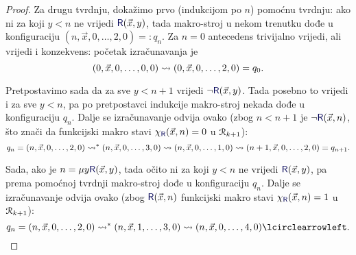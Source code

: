 \begin{proof}
	Za drugu tvrdnju, dokažimo prvo (indukcijom po $n$) pomoćnu tvrdnju: ako ni za koji $y<n$ ne vrijedi $\f R(\vec x,y)$, tada makro-stroj u nekom trenutku dođe u konfiguraciju $(n,\vec x,0,\dots,2,0)=:q_n$. Za $n=0$ antecedens trivijalno vrijedi, ali vrijedi i konzekvens: početak izračunavanja je
	\begin{equation}
		(0,\vec x,0,\dots,0,0)\leadsto(0,\vec x,0,\dots,2,0)=q_0\text.
	\end{equation}

	Pretpostavimo sada da za sve $y<n+1$ vrijedi $\lnot\f R(\vec x,y)$. Tada posebno to vrijedi i za sve $y<n$, pa po pretpostavci indukcije makro-stroj nekada dođe u konfiguraciju $q_n$. Dalje se izračunavanje odvija ovako (zbog $n<n+1$ je $\lnot\f R(\vec x,n)$, što znači da funkcijski makro stavi $\chi_{\f R}(\vec x,n)=0$ u $\mathcal R_{k+1}$): 
	\begin{equation*}
		q_n=(n,\vec x,0,\dots,2,0)\leadsto^*(n,\vec x,0,\dots,3,0)\leadsto(n,\vec x,0,\dots,1,0)\leadsto(n+1,\vec x,0,\dots,2,0)=q_{n+1}\text.
	\end{equation*}

	Sada, ako je $n=\mu y\f R(\vec x,y)$, tada očito ni za koji $y<n$ ne vrijedi $\f R(\vec x,y)$, pa prema pomoćnoj tvrdnji makro-stroj dođe u konfiguraciju $q_n$. Dalje se izračunavanje odvija ovako (zbog $\f R(\vec x,n)$ funkcijski makro stavi $\chi_{\f R}(\vec x,n)=1$ u $\mathcal R_{k+1}$):
	\begin{equation*}
		q_n=(n,\vec x,0,\dots,2,0)\leadsto^*(n,\vec x,1,\dots,3,0)\leadsto(n,\vec x,0,\dots,4,0)\lcirclearrowleft\text.
	\end{equation*}


\end{proof}
